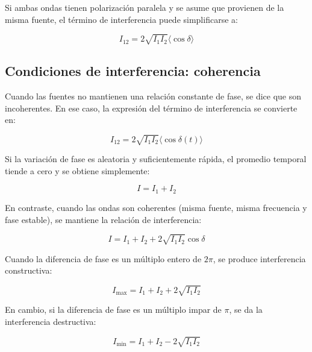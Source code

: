\documentclass[article,12pt]{elsarticle}
\begin{document}
Si ambas ondas tienen polarización paralela y se asume que provienen de la misma fuente, el término de interferencia puede simplificarse a:

\begin{equation}
I_{12} = 2\sqrt{I_1 I_2} \langle \cos \delta \rangle \label{eq10}
\end{equation}
\cite{barrios2025interferencia}

\subsection*{Condiciones de interferencia: coherencia}

Cuando las fuentes no mantienen una relación constante de fase, se dice que son incoherentes. En ese caso, la expresión del término de interferencia se convierte en:

\begin{equation}
I_{12} = 2\sqrt{I_1 I_2} \langle \cos \delta(t) \rangle \label{eq11}
\end{equation}
\cite{barrios2025interferencia}

Si la variación de fase es aleatoria y suficientemente rápida, el promedio temporal tiende a cero y se obtiene simplemente:

\begin{equation}
I = I_1 + I_2 \label{eq12}
\end{equation}
\cite{barrios2025interferencia}

En contraste, cuando las ondas son coherentes (misma fuente, misma frecuencia y fase estable), se mantiene la relación de interferencia:

\begin{equation}
I = I_1 + I_2 + 2\sqrt{I_1 I_2} \cos \delta \label{eq13}
\end{equation}
\cite{barrios2025interferencia}

Cuando la diferencia de fase es un múltiplo entero de $2\pi$, se produce interferencia constructiva:

\begin{equation}
I_{\text{max}} = I_1 + I_2 + 2\sqrt{I_1 I_2} \label{eq14}
\end{equation}
\cite{barrios2025interferencia}

En cambio, si la diferencia de fase es un múltiplo impar de $\pi$, se da la interferencia destructiva:

\begin{equation}
I_{\text{min}} = I_1 + I_2 - 2\sqrt{I_1 I_2} \label{eq15}
\end{equation}
\cite{barrios2025interferencia}
\end{document}
